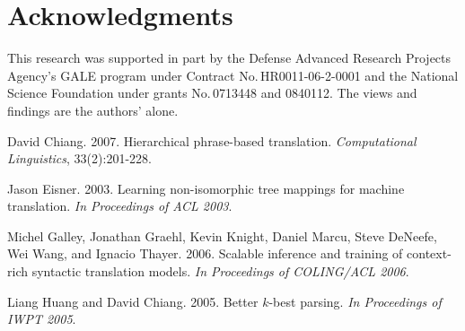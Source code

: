\documentclass[11pt]{article}
\begin{document}


\section*{Acknowledgments}
This research was supported in part by the Defense Advanced Research Projects Agency's GALE program under Contract No.\,HR0011-06-2-0001 and the National Science Foundation under grants No.\,0713448 and 0840112. The views and findings are the authors' alone.



\begin{thebibliography}{}
%
%


David Chiang. 2007. Hierarchical phrase-based translation. \emph{Computational Linguistics}, 33(2):201-228.

Jason Eisner. 2003. Learning non-isomorphic tree mappings
for machine translation. \emph{In Proceedings of ACL 2003}.

%

Michel Galley, Jonathan Graehl, Kevin Knight, Daniel Marcu, Steve DeNeefe, Wei Wang, and Ignacio
Thayer. 2006. Scalable inference and training of
context-rich syntactic translation models. \emph{In Proceedings of COLING/ACL 2006}.

Liang Huang and David Chiang. 2005.
Better $k$-best parsing.
\emph{In Proceedings of IWPT 2005}.



\end{thebibliography}
\end{document}
